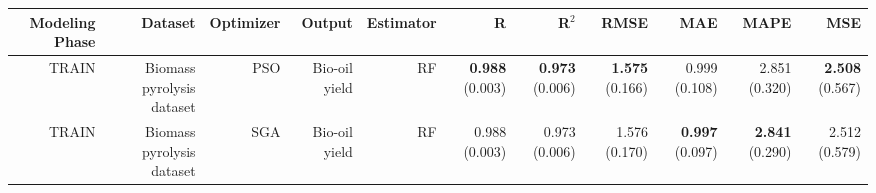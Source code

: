 \begin{table}
\centering
\label{eml___comparison_datasets_table_rf_biomass_pyrolysis_dataset_train.tex}
\begin{tabular}{rrrrrrrrrrr}
\toprule
Modeling Phase &                   Dataset & Optimizer &        Output & Estimator &                    R &                R$^2$ &                 RMSE &                  MAE &                 MAPE &                  MSE \\
\midrule
         TRAIN & Biomass pyrolysis dataset &       PSO & Bio-oil yield &        RF & { \bf 0.988} (0.003) & { \bf 0.973} (0.006) & { \bf 1.575} (0.166) &        0.999 (0.108) &        2.851 (0.320) & { \bf 2.508} (0.567) \\
         TRAIN & Biomass pyrolysis dataset &       SGA & Bio-oil yield &        RF &        0.988 (0.003) &        0.973 (0.006) &        1.576 (0.170) & { \bf 0.997} (0.097) & { \bf 2.841} (0.290) &        2.512 (0.579) \\
\bottomrule
\end{tabular}
\end{table}
